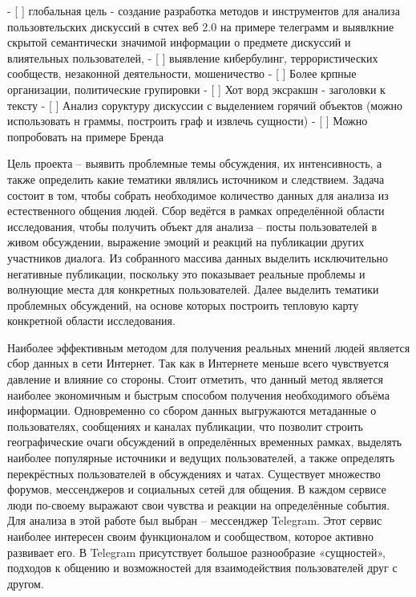 \documentclass[a4paper,article,14pt]{extarticle}
\begin{document}
- [ ] глобальная цель - создание разработка методов и инструментов для анализа пользовтельских дискуссий в счтех веб 2.0 на примере телеграмм и выявлкние скрытой семантически значимой информации о предмете дискуссий и влиятельных пользователей,
    - [ ] выявление кибербулинг, террористических сообществ, незаконной деятельности, мошеничество
    - [ ] Более крпные организации, политические групировки
    - [ ] Хот ворд эксракшн - заголовки к тексту
    - [ ] Анализ соруктуру дискуссии с выделением горячий объектов (можно использовать н граммы, построить граф и извлечь сущности)
    - [ ] Можно попробовать на примере Бренда



Цель проекта – выявить проблемные темы обсуждения, их интенсивность, а также определить какие тематики являлись источником и следствием.
Задача состоит в том, чтобы собрать необходимое количество данных для анализа из естественного общения людей. Сбор ведётся в рамках определённой области исследования, чтобы получить объект для анализа – посты пользователей в живом обсуждении, выражение эмоций и реакций на публикации других участников диалога. Из собранного массива данных выделить исключительно негативные публикации, поскольку это показывает реальные проблемы и волнующие места для конкретных пользователей. Далее выделить тематики проблемных обсуждений, на основе которых построить тепловую карту конкретной области исследования.

Наиболее эффективным методом для получения реальных мнений людей является сбор данных в сети Интернет. Так как в Интернете меньше всего чувствуется давление и влияние со стороны. Стоит отметить, что данный метод является наиболее экономичным и быстрым способом получения необходимого объёма информации.
Одновременно со сбором данных выгружаются метаданные о пользователях, сообщениях и каналах публикации, что позволит строить географические очаги обсуждений в определённых временных рамках, выделять наиболее популярные источники и ведущих пользователей, а также определять перекрёстных пользователей в обсуждениях и чатах.
Существует множество форумов, мессенджеров и социальных сетей для общения. В каждом сервисе люди по-своему выражают свои чувства и реакции на определённые события. Для анализа в этой работе был выбран – мессенджер Telegram. Этот сервис наиболее интересен своим функционалом и сообществом, которое активно развивает его. В Telegram присутствует большое разнообразие «сущностей», подходов к общению и возможностей для взаимодействия пользователей друг с другом.
\end{document}
